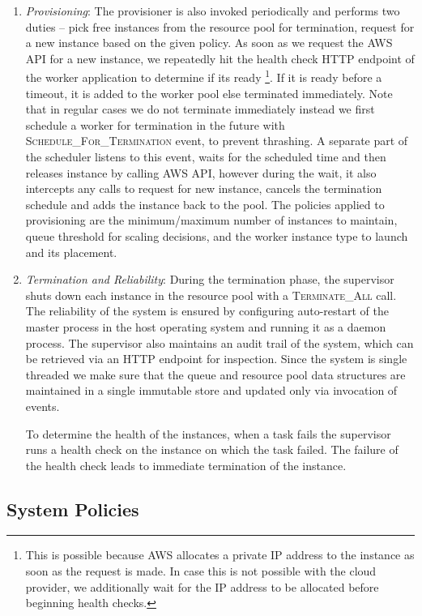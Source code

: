 \documentclass[a4paper]{IEEEtran}
\begin{document}
\begin{enumerate}
  \item \emph{Provisioning}: The provisioner is also invoked periodically and performs two duties -- pick free instances from the 
  resource pool for termination, request for a new instance based on the given policy. As soon as we request the AWS API
  for a new instance, we repeatedly hit the health check HTTP endpoint of the worker application to determine if its ready
  \footnote{This is possible because AWS allocates a private IP address to the instance as soon as the request is made. In case this 
  is not possible with the cloud provider, we additionally wait for the IP address to be allocated before beginning health checks.}.
  If it is ready before a timeout, it is added to the worker pool else terminated immediately. Note that in regular cases we do not terminate immediately
  instead we first schedule a worker for termination in the future with \textsc{Schedule\_For\_Termination} event, to prevent thrashing.
  A separate part of the scheduler listens to this event, waits for the scheduled time and then releases instance by calling AWS API, however during the
  wait, it also intercepts any calls to request for new instance, cancels the termination schedule and adds the instance back to the pool.
  The policies applied to provisioning are the minimum/maximum number of instances to maintain, queue threshold for scaling
  decisions, and the worker instance type to launch and its placement.

  \item \emph{Termination and Reliability}: During the termination phase, the supervisor shuts down each instance in
  the resource pool with a \textsc{Terminate\_All} call. The reliability of the system is ensured by configuring auto-restart
  of the master process in the host operating system and running it as a daemon process. The supervisor also maintains
  an audit trail of the system, which can be retrieved via an HTTP endpoint for inspection. Since the system is
  single threaded we make sure that the queue and resource pool data structures are maintained in a single
  immutable store and updated only via invocation of events.
  
  To determine the health of the instances, when a task fails the supervisor runs a health check on the instance
  on which the task failed. The failure of the health check leads to immediate termination of the instance.

\end{enumerate}

\subsection{System Policies}
\end{document}
